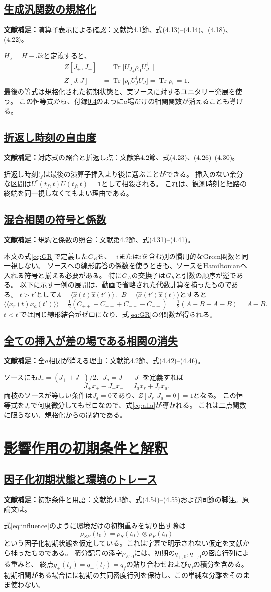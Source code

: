 \documentclass[a4paper,11pt]{ltjsarticle}
\newcommand{\sectionlink}[1]{\section[#1]{\hyperlink{toc}{#1}}}
\newcommand{\subsectionlink}[1]{\subsection[#1]{\hyperlink{toc}{#1}}}
\numberwithin{equation}{section}
\newcommand{\Tr}{\operatorname{Tr}}
\newcommand{\id}{\mathbf{1}}
\newcommand{\av}[1]{\langle #1\rangle}
\newcommand{\pav}[1]{\langle\!\langle #1\rangle\!\rangle}
\newcommand{\supplement}[1]{\par\medskip\noindent\textcolor{notered}{\textbf{文献補足：}}#1\par\smallskip}
\begin{document}
\subsectionlink{生成汎関数の規格化}
\label{app:normalization}
\supplement{演算子表示による確認：文献\cite{Pajer:2026fuo}第4.1節、式(4.13)--(4.14)、(4.18)、(4.22)。}
$H_J=H-J\hat x$と定義すると、
\begin{align}
 Z[J_+,J_-]&=\Tr\bigl[U_{J_+}\rho_0U_{J_-}^\dagger\bigr],\\
 Z[J,J]&=\Tr\bigl[\rho_0 U_J^\dagger U_J\bigr]=\Tr\rho_0=1.
\end{align}
最後の等式は規格化された初期状態と、実ソースに対するユニタリー発展を使う。
この恒等式から、付録\ref{app:alla}のように$a$場だけの相関関数が消えることも導ける。

\subsectionlink{折返し時刻の自由度}
\label{app:turnaround}
\supplement{対応式の照合と折返し点：文献\cite{Pajer:2026fuo}第4.2節、式(4.23)、(4.26)--(4.30)。}
折返し時刻$t_f$は最後の演算子挿入より後に選ぶことができる。
挿入のない余分な区間は$U^\dagger(t_f,t)U(t_f,t)=\id$として相殺される。
これは、観測時刻と経路の終端を同一視しなくてもよい理由である。

\subsectionlink{混合相関の符号と係数}
\label{app:ra}
\supplement{規約と係数の照合：文献\cite{Pajer:2026fuo}第4.2節、式(4.31)--(4.41)。}
本文の式\eqref{eq:GR}で定義した$G_R$を、$-i$または$i$を含む別の慣用的なGreen関数と同一視しない。
ソースへの線形応答の係数を使うときも、ソースをHamiltonianへ入れる符号と揃える必要がある。
特に$G_A$の交換子は$G_R$と引数の順序が逆である。
以下に示す一例の展開は、動画で省略された代数計算を補ったものである。
$t>t'$として$A=\av{\hat x(t)\hat x(t')}$、$B=\av{\hat x(t')\hat x(t)}$とすると
\begin{equation}
 \pav{x_r(t)x_a(t')}
   =\tfrac12(C_{++}-C_{+-}+C_{-+}-C_{--})
   =\tfrac12(A-B+A-B)=A-B.
\end{equation}
$t<t'$では同じ線形結合がゼロになり、式\eqref{eq:GR}の$\theta$関数が得られる。

\subsectionlink{全ての挿入が差の場である相関の消失}
\label{app:alla}
\supplement{全$a$相関が消える理由：文献\cite{Pajer:2026fuo}第4.2節、式(4.42)--(4.46)。}
ソースにも$J_r=(J_++J_-)/2$、$J_a=J_+-J_-$を定義すれば
\begin{equation}
 J_+x_+-J_-x_-=J_a x_r+J_r x_a.
\end{equation}
両枝のソースが等しい条件は$J_a=0$であり、$Z[J_r,J_a=0]=1$となる。
この恒等式を$J_r$で何度微分してもゼロなので、式\eqref{eq:alla}が導かれる。
これは二点関数に限らない、規格化からの制約である。

\clearpage
\sectionlink{影響作用の初期条件と解釈}
\label{app:influence}

\subsectionlink{因子化初期状態と環境のトレース}
\label{app:initial}
\supplement{初期条件と用語：文献\cite{Pajer:2026fuo}第4.3節、式(4.54)--(4.55)および同節の脚注。原論文は\cite{Feynman:1963fq}。}
式\eqref{eq:influence}のように環境だけの初期重みを切り出す際は
\begin{equation}\rho_{SE}(t_0)=\rho_S(t_0)\otimes\rho_E(t_0)
\end{equation}
という因子化初期状態を仮定している。これは字幕で明示されない仮定を文献から補ったものである。
積分記号の添字$\rho_{E,0}$には、初期の$q_{+,0},q_{-,0}$の密度行列による重みと、
終点$q_+(t_f)=q_-(t_f)=q_f$の貼り合わせおよび$q_f$の積分を含める。
初期相関がある場合には初期の共同密度行列を保持し、この単純な分離をそのまま使わない。
\end{document}
